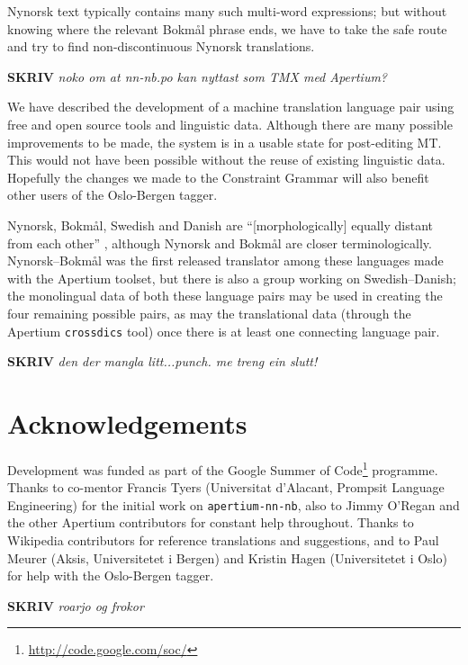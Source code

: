 \documentclass[11pt]{article}
\newcommand{\comment}[1]{\textbf{SKRIV} {\it #1}}
\begin{document}
Nynorsk text typically contains many such multi-word expressions; but
without knowing where the relevant Bokmål phrase ends, we have to take
the safe route and try to find non-discontinuous Nynorsk translations.

\comment{ noko om at nn-nb.po kan nyttast som TMX med Apertium?}

We have described the development of a machine translation language
pair using free and open source tools and linguistic data. Although
there are many possible improvements to be made, the system is in a
usable state for post-editing MT. This would not have been possible
without the reuse of existing linguistic data. Hopefully the changes
we made to the Constraint Grammar will also benefit other users of the
Oslo-Bergen tagger. 

Nynorsk, Bokmål, Swedish and Danish are ``[morphologically] equally
distant from each other'' \citep[p.~1]{everson2000sln}, although
Nynorsk and Bokmål are closer terminologically. Nynorsk–Bokmål was the
first released translator among these languages made with the Apertium
toolset, but there is also a group working on Swedish–Danish; the
monolingual data of both these language pairs may be used in creating
the four remaining possible pairs, as may the translational data
(through the Apertium {\tt crossdics} tool) once there is at least one
connecting language pair. 

\comment{den der mangla litt...punch. me treng ein slutt!}


\section*{Acknowledgements}

Development was funded as part of the Google Summer of
Code\footnote{\href{http://code.google.com/soc/}{http://code.google.com/soc/}
} programme. Thanks to co-mentor Francis Tyers (Universitat d'Alacant,
Prompsit Language Engineering) for the initial work on {\tt apertium-nn-nb},
also to Jimmy O'Regan and the other Apertium contributors for constant
help throughout. Thanks to Wikipedia contributors for reference
translations and suggestions, and to Paul Meurer (Aksis, Universitetet
i Bergen) and Kristin Hagen (Universitetet i Oslo) for help with the
Oslo-Bergen tagger.

\comment{ roarjo og frokor}




\end{document}
